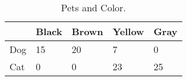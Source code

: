 \begin{table}[ht]
\centering
\begin{tabular}{|l|l|l|l|l|}
  \hline
 & Black & Brown & Yellow & Gray \\ 
  \hline
Dog &  15 &  20 &   7 &   0 \\ 
  Cat &   0 &   0 &  23 &  25 \\ 
   \hline
\end{tabular}
\caption{Pets and Color.\label{tab:petColor}} 
\end{table}
